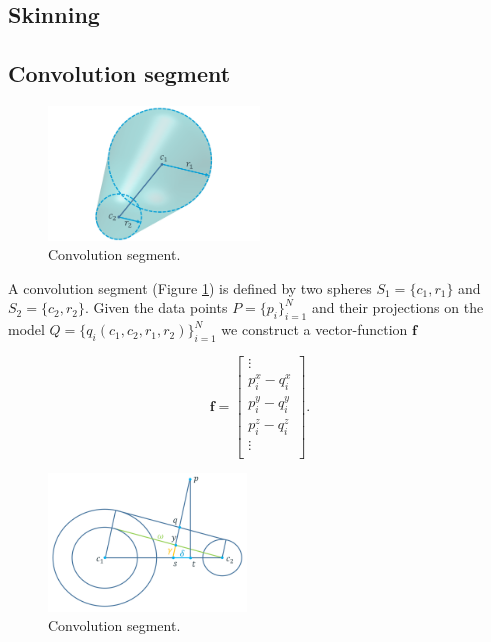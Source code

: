 \subsection{Skinning}


\appendix
\subsection{Convolution segment}

\begin{figure}[h!] 
	\centering
	\includegraphics[width=0.5\textwidth]{figures/convsegment.png}
	\caption{Convolution segment.}
	\label{fig:convsegment}
\end{figure}

A convolution segment (Figure \ref{fig:convsegment}) is defined by two spheres $S_1 = \{c_1, r_1\}$ and $S_2 = \{c_2, r_2\}$.
Given the data points $P = \{p_i\}_{i = 1}^N$ and their projections on the model  $Q = \{q_i(c_1, c_2, r_1, r_2)\}_{i = 1}^N$  we construct a vector-function $\textbf{f}$ 

 \begin{equation}
 	\textbf{f} = \left[
 		\begin{array}{c}
 			\vdots \\
			p_i^x - q_i^x\\
			p_i^y - q_i^y\\
			p_i^z - q_i^z\\
			\vdots \\
	\end{array}
 	\right].
 \end{equation} 

\begin{figure}[h!] 
	\centering
	\hspace{-2em}
	\includegraphics[width=0.47\textwidth]{figures/projection_convsegment.png}
	\caption{Convolution segment.}
	\label{fig:projection_convsegment}
\end{figure}

